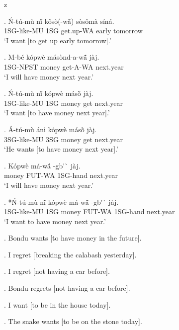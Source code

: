 z   \documentclass{assets/fieldnotes}
\begin{document}

\exg. \'{N}-t\'{u}-m\`{u} nĩ́ k\^{o}s\`{o}(-wã̀) s\`{o}s\^{o}m\`{a} s\'{i}n\'{a}. \\
1SG-like-MU 1SG get.up-WA early tomorrow \\
`I want [to get up early tomorrow].' 

\exg. M-b\'{e} k\'{o}pw\`{e} m\'{a}s\`{o}nd-a-wã́ j\`{a}j.  \\
1SG-NPST money get-A-WA next.year \\
`I will have money next year.'

\exg. \'{N}-t\'{u}-m\`{u} nĩ́ k\'{o}pw\`{e} m\'{a}sõ̀ j\`{a}j.  \\
1SG-like-MU 1SG money get next.year \\
`I want [to have money next year].' 

\exg. \'{A}-t\'{u}-m\`{u} \'{a}n\`{i} k\'{o}pw\`{e} m\'{a}sõ̀ j\`{a}j.  \\
3SG-like-MU 3SG money get next.year \\
`He wants [to have money next year].' 

\exg. K\'{o}pw\`{e} m\'{a}-wã́ -gb\'{}\`{} j\`{a}j.  \\
money FUT-WA 1SG-hand next.year \\
`I will have money next year.'

\exg. *\'{N}-t\'{u}-m\`{u} nĩ́  k\'{o}pw\`{e} m\'{a}-wã́ -gb\'{}\`{} j\`{a}j.  \\
1SG-like-MU 1SG money FUT-WA 1SG-hand next.year \\
`I want to have money next year.' 

\ex. Bondu wants [to have money in the future]. 

\ex. I regret [breaking the calabash yesterday]. 

\ex. I regret [not having a car before]. 

\ex. Bondu regrets [not having a car before]. 

\ex. I want [to be in the house today]. 

\ex. The snake wants [to be on the stone today].  


\end{document}
